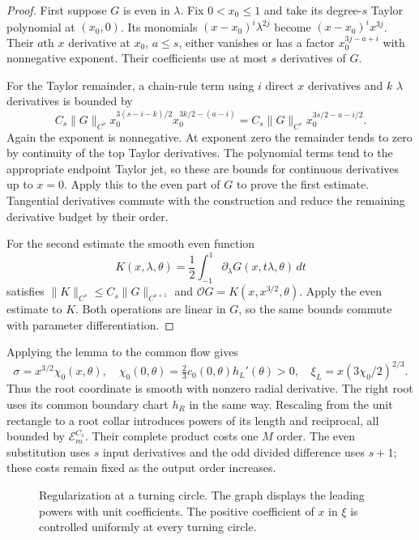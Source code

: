 \begin{proof}
First suppose $G$ is even in $\lambda$. Fix $0<x_0\le1$ and
take its degree-$s$ Taylor polynomial at $(x_0,0)$.
Its monomials $(x-x_0)^i\lambda^{2j}$ become
$(x-x_0)^ix^{3j}$. Their $a$th $x$ derivative at $x_0$, $a\le s$,
either vanishes or has a factor $x_0^{3j-a+i}$ with nonnegative
exponent. Their coefficients use at most $s$ derivatives of $G$.

For the Taylor remainder, a chain-rule term using $i$ direct
$x$ derivatives and $k$ $\lambda$ derivatives is bounded by
\[
 C_s\|G\|_{C^s}
 x_0^{3(s-i-k)/2}x_0^{3k/2-(a-i)}
 =C_s\|G\|_{C^s}x_0^{3s/2-a-i/2}.
\]
Again the exponent is nonnegative. At exponent zero the remainder
tends to zero by continuity of the top Taylor derivatives. The
polynomial terms tend to the appropriate endpoint Taylor jet, so
these are bounds for continuous derivatives up to $x=0$.
Apply this to the even part of $G$ to prove the first estimate.
Tangential derivatives commute with the construction and reduce
the remaining derivative budget by their order.

For the second estimate the smooth even function
\[
 K(x,\lambda,\theta)
 =\frac12\int_{-1}^1\partial_\lambda G(x,t\lambda,\theta)\,dt
\]
satisfies $\|K\|_{C^s}\le C_s\|G\|_{C^{s+1}}$ and
$\mathcal O G=K(x,x^{3/2},\theta)$. Apply the even estimate to
$K$. Both operations are linear in $G$, so the same bounds commute
with parameter differentiation.
\end{proof}

Applying the lemma to the common flow gives
\[
 \sigma=x^{3/2}\chi_0(x,\theta),\quad
 \chi_0(0,\theta)=\tfrac23c_0(0,\theta)h_L'(\theta)>0,\quad
 \xi_L=x(3\chi_0/2)^{2/3}.
\]
Thus the root coordinate is smooth with nonzero radial derivative.
The right root uses its common boundary chart $h_R$ in the same way.
Rescaling from the unit rectangle to a root collar introduces powers
of its length and reciprocal, all bounded by $\mathcal E_m^{C_s}$.
Their complete product costs one $M$ order. The even substitution
uses $s$ input derivatives and the odd divided difference uses
$s+1$; these costs remain fixed as the output order increases.

\begin{figure}[htbp]
\centering
{}
\caption{Regularization at a turning circle. The graph displays the
leading powers with unit coefficients. The positive coefficient of
$x$ in $\xi$ is controlled uniformly at every turning circle.}
\label{fig:root-regularization}
\end{figure}

